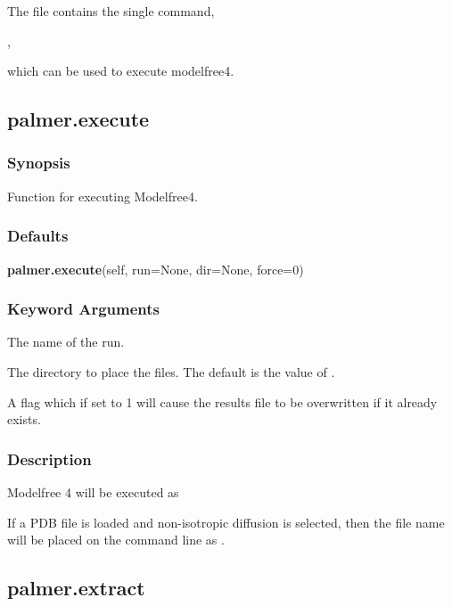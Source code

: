 The file 
 contains the single command,

,

which can be used to execute modelfree4.


\newpage

\subsection{palmer.execute}


\subsubsection{Synopsis}

Function for executing Modelfree4.

\subsubsection{Defaults}

\textsf{\textbf{palmer.execute}(self, run=None, dir=None, force=0)}


\subsubsection{Keyword Arguments}


  The name of the run.

  The directory to place the files.  The default is the value of 
.

  A flag which if set to 1 will cause the results file to be overwritten if it already exists.

\subsubsection{Description}

Modelfree 4 will be executed as


If a PDB  file is loaded and non-isotropic diffusion is selected, then the file name will be
placed on the command line as 
.


\newpage

\subsection{palmer.extract}



